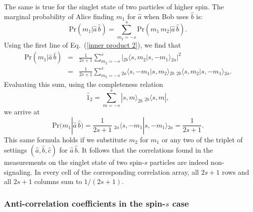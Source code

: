 The same is true for the singlet state of two particles of higher spin. The marginal probability of Alice finding $m_1$ for $\hat{a}$ when Bob uses $\hat{b}$ is:
\begin{equation}
\mathrm{Pr}(m_{1}| \hat{a}\, \hat{b}) = \sum_{m_2=-s}^s \mathrm{Pr}(m_1 \,m_2| \hat{a}\, \hat{b}).
\end{equation}
Using the first line of Eq.\ (\ref{inner product 2}), we find that
\begin{eqnarray} 
\mathrm{Pr}(m_{1}| \hat{a}\, \hat{b}) 
& \!\!\! = \!\!\! &\frac{1}{2s+1} \! \sum_{m_2=-s}^s \! \Big|{_{2b}}\langle s, m_2|s, -m_1\rangle{_{2a}}\Big|^2 \label{nonsignal 2} \nonumber \\[.3 cm]
& \!\!\! = \!\!\! &\frac{1}{2s+1} \! \sum_{m_2=-s}^s \!
{_{2a}}\langle s, -m_1|s,m_2\rangle{_{2b}}\; {_{2b}}\langle s, m_2|s,-m_1\rangle{_{2a}}.
\end{eqnarray}
Evaluating this sum, using the completeness relation
\begin{equation}
\hat{1}_2 = \sum_{m=-s}^s |s,m \rangle_{\!2b}\; {_{2b\!}}\langle s, m|,
\label{completeness}
\end{equation}
we arrive at
\begin{equation}
\mathrm{Pr}(m_{1}| \hat{a}\, \hat{b}) = \frac{1}{2s+1} \;
{_{2a}}\langle s, -m_1|s,-m_1\rangle{_{2a}} = \frac{1}{2s+1}.
\label{nonsignal 3}
\end{equation}
This same formula holds if we substitute $m_2$ for $m_1$ or any two of the triplet of settings $(\hat{a}, \hat{b}, \hat{c})$ for $\hat{a}\, \hat{b}$. It follows that the correlations found in the measurements on the singlet state of two spin-$s$ particles are indeed non-signaling. In every cell of the corresponding correlation array, all $2s+1$ rows and all $2s+1$ columns sum to $1/(2s+1)$.   

\subsubsection{Anti-correlation coefficients in the spin-$s$ case} \label{2.1.5}

